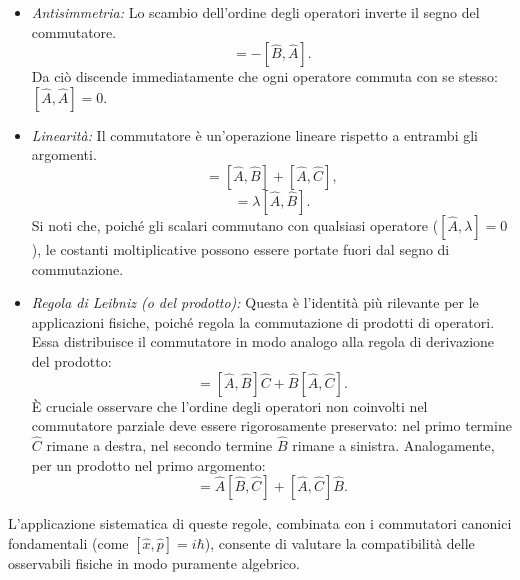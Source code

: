 \documentclass[a4paper,11pt]{report}
\begin{document}
\begin{itemize}
    \item \textit{Antisimmetria:}
    Lo scambio dell'ordine degli operatori inverte il segno del commutatore.
    \begin{equation}
        [\hat{A}, \hat{B}] = - [\hat{B}, \hat{A}].
    \end{equation}
    Da ciò discende immediatamente che ogni operatore commuta con se stesso: $[\hat{A}, \hat{A}] = 0$.

    \item \textit{Linearità:}
    Il commutatore è un'operazione lineare rispetto a entrambi gli argomenti.
    \begin{equation}
        [\hat{A}, \hat{B} + \hat{C}] = [\hat{A}, \hat{B}] + [\hat{A}, \hat{C}],
    \end{equation}
    \begin{equation}
        [\hat{A}, \lambda \hat{B}] = \lambda [\hat{A}, \hat{B}].
    \end{equation}
    Si noti che, poiché gli scalari commutano con qualsiasi operatore ($[\hat{A}, \lambda] = 0$), le costanti moltiplicative possono essere portate fuori dal segno di commutazione.

    \item \textit{Regola di Leibniz (o del prodotto):}
    Questa è l'identità più rilevante per le applicazioni fisiche, poiché regola la commutazione di prodotti di operatori. Essa distribuisce il commutatore in modo analogo alla regola di derivazione del prodotto:
    \begin{equation}
        [\hat{A}, \hat{B}\hat{C}] = [\hat{A}, \hat{B}]\hat{C} + \hat{B}[\hat{A}, \hat{C}].
    \end{equation}
    È cruciale osservare che l'ordine degli operatori non coinvolti nel commutatore parziale deve essere rigorosamente preservato: nel primo termine $\hat{C}$ rimane a destra, nel secondo termine $\hat{B}$ rimane a sinistra.
    Analogamente, per un prodotto nel primo argomento:
    \begin{equation}
        [\hat{A}\hat{B}, \hat{C}] = \hat{A}[\hat{B}, \hat{C}] + [\hat{A}, \hat{C}]\hat{B}.
    \end{equation}
\end{itemize}
L'applicazione sistematica di queste regole, combinata con i commutatori canonici fondamentali (come $[\hat{x}, \hat{p}] = i\hbar$), consente di valutare la compatibilità delle osservabili fisiche in modo puramente algebrico.
\end{document}
